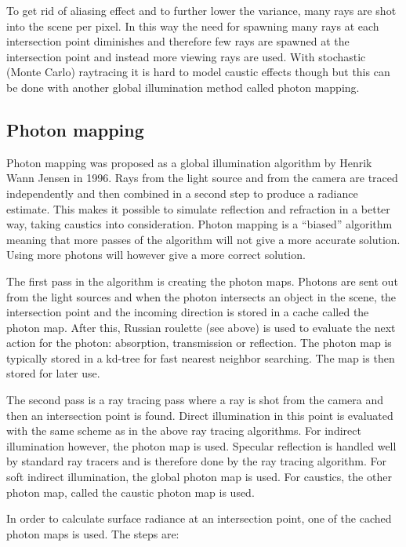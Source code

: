 \documentclass[a4paper]{report}
\begin{document}
To get rid of aliasing effect and to further lower the variance, many
rays are shot into the scene per pixel. In this way the need for
spawning many rays at each intersection point diminishes and therefore
few rays are spawned at the intersection point and instead more
viewing rays are used. With stochastic (Monte Carlo) raytracing it is
hard to model caustic effects though but this can be done with another
global illumination method called photon mapping.

\subsection{Photon mapping}

Photon mapping was proposed as a global illumination algorithm by
Henrik Wann Jensen \cite{jensen} in 1996. Rays from the light source
and from the camera are traced independently and then combined in a
second step to produce a radiance estimate. This makes it possible to
simulate reflection and refraction in a better way, taking caustics
into consideration. Photon mapping is a ``biased'' algorithm meaning
that more passes of the algorithm will not give a more accurate
solution. Using more photons will however give a more correct solution.

The first pass in the algorithm is creating the photon maps. Photons
are sent out from the light sources and when the photon intersects an
object in the scene, the intersection point and the incoming direction
is stored in a cache called the photon map. After this, Russian
roulette (see above) is used to evaluate the next action for the
photon: absorption, transmission or reflection. The photon map is
typically stored in a kd-tree for fast nearest neighbor searching. The
map is then stored for later use.

The second pass is a ray tracing pass where a ray is shot from the
camera and then an intersection point is found. Direct illumination in
this point is evaluated with the same scheme as in the above ray
tracing algorithms. For indirect illumination however, the photon map
is used. Specular reflection is handled well by standard ray tracers
and is therefore done by the ray tracing algorithm. For soft indirect
illumination, the global photon map is used. For caustics, the other
photon map, called the caustic photon map is used.

In order to calculate surface radiance at an intersection point, one
of the cached photon maps is used. The steps are:
\end{document}
